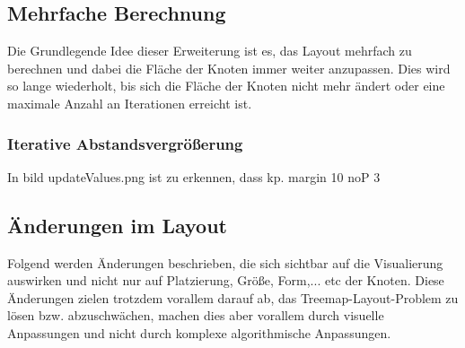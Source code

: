 
\subsection{Mehrfache Berechnung} \label{sec:MehrfacheBerechnung}
Die Grundlegende Idee dieser Erweiterung ist es, das Layout mehrfach zu berechnen und dabei die Fläche der Knoten immer weiter anzupassen. Dies wird so lange wiederholt, bis sich die Fläche der Knoten nicht mehr ändert oder eine maximale Anzahl an Iterationen erreicht ist.

\subsubsection{Iterative Abstandsvergrößerung} \label{sec:IterativeAbstandsvergrößerung}
In bild updateValues.png ist zu erkennen, dass kp. margin 10 noP 3

\subsection{Änderungen im Layout} \label{sec:LayoutÄnderungen}
Folgend werden Änderungen beschrieben, die sich sichtbar auf die Visualierung auswirken und nicht nur auf Platzierung, Größe, Form,... etc der Knoten. Diese Änderungen zielen trotzdem vorallem darauf ab, das Treemap-Layout-Problem zu lösen bzw. abzuschwächen, machen dies aber vorallem durch visuelle Anpassungen und nicht durch komplexe algorithmische Anpassungen.

